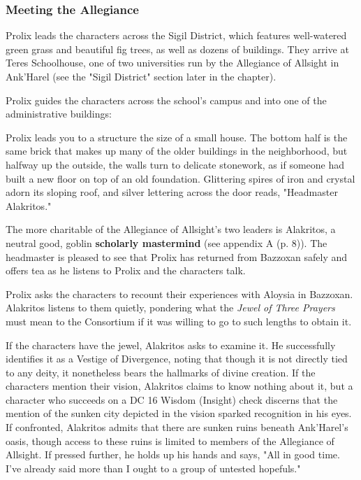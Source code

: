 \documentclass[a4paper, 11pt, bg=full, twocolumn, nooutline]{dndbook}
\begin{document}
\subsubsection{Meeting the Allegiance}

Prolix leads the characters across the Sigil District, which features well-watered green grass and beautiful fig trees, as well as dozens of buildings. They arrive at Teres Schoolhouse, one of two universities run by the Allegiance of Allsight in Ank'Harel (see the "Sigil District" section later in the chapter).

Prolix guides the characters across the school's campus and into one of the administrative buildings:

\begin{DndReadAloud}
Prolix leads you to a structure the size of a small house. The bottom half is the same brick that makes up many of the older buildings in the neighborhood, but halfway up the outside, the walls turn to delicate stonework, as if someone had built a new floor on top of an old foundation. Glittering spires of iron and crystal adorn its sloping roof, and silver lettering across the door reads, "Headmaster Alakritos."
\end{DndReadAloud}

The more charitable of the Allegiance of Allsight's two leaders is Alakritos, a neutral good, goblin \textbf{scholarly mastermind} (see appendix A (p. 8)). The headmaster is pleased to see that Prolix has returned from Bazzoxan safely and offers tea as he listens to Prolix and the characters talk.

Prolix asks the characters to recount their experiences with Aloysia in Bazzoxan. Alakritos listens to them quietly, pondering what the \textit{Jewel of Three Prayers} must mean to the Consortium if it was willing to go to such lengths to obtain it.

If the characters have the jewel, Alakritos asks to examine it. He successfully identifies it as a Vestige of Divergence, noting that though it is not directly tied to any deity, it nonetheless bears the hallmarks of divine creation. If the characters mention their vision, Alakritos claims to know nothing about it, but a character who succeeds on a DC 16 Wisdom (Insight) check discerns that the mention of the sunken city depicted in the vision sparked recognition in his eyes. If confronted, Alakritos admits that there are sunken ruins beneath Ank'Harel's oasis, though access to these ruins is limited to members of the Allegiance of Allsight. If pressed further, he holds up his hands and says, "All in good time. I've already said more than I ought to a group of untested hopefuls."
\end{document}

